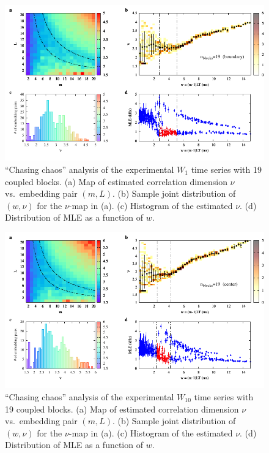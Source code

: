 \begin{appendices}
\begin{figure}[!htbp]
    \centering
    \includegraphics[width=\linewidth]{../blocks/19_blocks/edge/2e5_points/plots/chaos_low.pdf}
    \caption{``Chasing chaos'' analysis of the experimental $W_1$ time series with 19 coupled blocks.
    (a) Map of estimated correlation dimension $\nu$ vs.\ embedding pair $(m, L)$.
    (b) Sample joint distribution of $(w,\nu)$ for the $\nu$-map in (a).
    (c) Histogram of the estimated $\nu$. (d) Distribution of MLE as a function of $w$.
    } 
\end{figure}

\begin{figure}[!htbp]
    \centering
    \includegraphics[width=\linewidth]{../blocks/19_blocks/middle/2e5_points/plots/chaos_low.pdf}
    \caption{``Chasing chaos'' analysis of the experimental $W_{10}$ time series with 19 coupled blocks.
    (a) Map of estimated correlation dimension $\nu$ vs.\ embedding pair $(m, L)$.
    (b) Sample joint distribution of $(w,\nu)$ for the $\nu$-map in (a).
    (c) Histogram of the estimated $\nu$. (d) Distribution of MLE as a function of $w$.
    } 
\end{figure}


\end{appendices}
